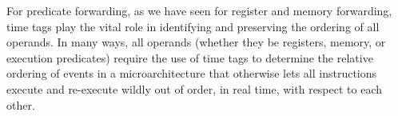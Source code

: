 For predicate forwarding, as we have seen for register and
memory forwarding, time tags play the vital role in
identifying and preserving the ordering of all operands.
In many ways, all operands (whether they be registers, memory,
or execution predicates) require the use of time tags to
determine the relative ordering of events in a microarchitecture
that otherwise lets all instructions execute and re-execute
wildly out of order, in real time, with respect to each other.


